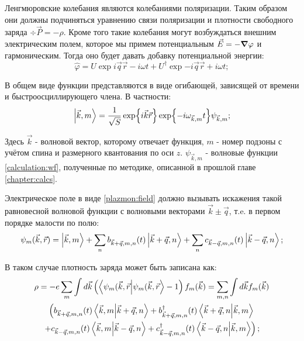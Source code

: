\documentclass[../main.tex]{subfiles}
\begin{document}
    Ленгмюровские колебания являются колебаниями поляризации. Таким
    образом они должны подчиняться уравнению связи поляризации и 
    плотности свободного заряда $\div \vec P  = - \rho$. Кроме того 
    такие колебания могут возбуждаться внешним электрическим полем, 
    которое мы примем потенциальным $\vec E = - \grad \varphi$ и 
    гармоническим. Тогда оно будет давать добавку потенциальной энергии:
    \begin{equation}
        \label{plazmon:field}
        \hat \varphi  = U \exp{i\vec q \vec r - i \omega t}
            + U^{\dagger} \exp{-i\vec q\vec r + i \omega t};
    \end{equation}

    В общем виде функции представляются в виде огибающей, зависящей 
    от времени и быстроосциллирующего члена. В частности:
    \begin{equation}
        \label{plasmons:wf0}
        \ket{\vec k, m} = \frac{1}{\sqrt S} \exp{i\vec k \vec r}
            \exp{-i \omega_{\vec k, m} t} \psi_{\vec k, m};
    \end{equation}

    Здесь $\vec k$ - волновой вектор, которому отвечает функция, 
    $m$ - номер подзоны с учётом спина и размерного квантования 
    по оси $z$. $\psi_{\vec k, m}$ - волновые функции
    \ref{calculation:wf}, полученные по методике, 
    описанной в прошлой главе \ref{chapter:calcs}. 

    Электрическое поле в виде \ref{plazmon:field} должно вызывать 
    искажения 
    такой равновесной волновой функции с волновыми векторами
    $\vec k \pm \vec q$, т.e. в первом порядке малости по полю:
    \begin{equation}
        \label{plasmons:wf1}
        \psi_m (\vec k, \vec r) = \ket{\vec k, m} + \sum_n b_{\vec k 
            + \vec q, m, n} (t) \ket{\vec k + \vec q, n} + \sum_n 
            c_{\vec k - \vec q, m, n} (t) \ket{\vec k - \vec q, n};
    \end{equation}

    В таком случае плотность заряда может быть записана как:
    \begin{multline}
        \label{charge_density}
        \rho = -e \sum_{m} \int d\vec k  \left(
            \bra{\psi_m (\vec k, \vec r}\ket{\psi_m (\vec k, 
            \vec r} - 1\right) f_m(\vec k) =
            \sum_{m, n} \int d \vec k f_m (\vec k) \\
            \left( b_{\vec k + \vec q, m, n} (t)
            \bra{\vec k, m} \ket{\vec k 
            + \vec q, n} + b^\dagger_{\vec k + \vec q, m, n} (t) 
            \bra{\vec k + \vec q, n} \ket{\vec k, m}\right.\\ 
            \left. + c_{\vec k - \vec q, m, n} (t) \bra{\vec k, m} 
            \ket{\vec k  - \vec q, n} + c^\dagger_{\vec k - \vec q, m, n} 
            (t) \bra{\vec k - \vec q, n} \ket{\vec k, m} \right);
    \end{multline}
    
\end{document}
